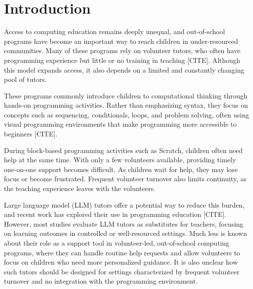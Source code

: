 \documentclass[fleqn,10pt]{JLA_article} %
\affiliation{\textsuperscript{1}\textit{Department of Education, Example University, City, Country. email icon: somebody@gmail.com}} %
\affiliation{\textsuperscript{2}\textit{Department of Computer Science, Example University, City, Country. email icon: somebody@gmail.com}} %
\begin{document}
\flushbottom %

\maketitle %


\thispagestyle{fancy} %



\section{Introduction} %

Access to computing education remains deeply unequal, and out-of-school programs have become an important way to reach children in under-resourced communities. Many of these programs rely on volunteer tutors, who often have programming experience but little or no training in teaching [CITE]. Although this model expands access, it also depends on a limited and constantly changing pool of tutors.

These programs commonly introduce children to computational thinking through hands-on programming activities. Rather than emphasizing syntax, they focus on concepts such as sequencing, conditionals, loops, and problem solving, often using visual programming environments that make programming more accessible to beginners [CITE].

During block-based programming activities such as Scratch, children often need help at the same time. With only a few volunteers available, providing timely one-on-one support becomes difficult. As children wait for help, they may lose focus or become frustrated. Frequent volunteer turnover also limits continuity, as the teaching experience leaves with the volunteers.

Large language model (LLM) tutors offer a potential way to reduce this burden, and recent work has explored their use in programming education [CITE]. However, most studies evaluate LLM tutors as substitutes for teachers, focusing on learning outcomes in controlled or well-resourced settings. Much less is known about their role as a support tool in volunteer-led, out-of-school computing programs, where they can handle routine help requests and allow volunteers to focus on children who need more personalized guidance. It is also unclear how such tutors should be designed for settings characterized by frequent volunteer turnover and no integration with the programming environment.
\end{document}
